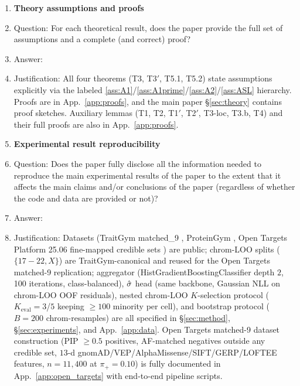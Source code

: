 \begin{enumerate}
\item {\bf Theory assumptions and proofs}
    \item[] Question: For each theoretical result, does the paper provide the full set of assumptions and a complete (and correct) proof?
    \item[] Answer: \answerYes{}
    \item[] Justification: All four theorems (T3, T3$'$, T5.1, T5.2) state assumptions explicitly via the labeled \ref{ass:A1}/\ref{ass:A1prime}/\ref{ass:A2}/\ref{ass:ASL} hierarchy. Proofs are in App.~\ref{app:proofs}, and the main paper §\ref{sec:theory} contains proof sketches. Auxiliary lemmas (T1, T2, T1$'$, T2$'$, T3-loc, T3.b, T4) and their full proofs are also in App.~\ref{app:proofs}.

\item {\bf Experimental result reproducibility}
    \item[] Question: Does the paper fully disclose all the information needed to reproduce the main experimental results of the paper to the extent that it affects the main claims and/or conclusions of the paper (regardless of whether the code and data are provided or not)?
    \item[] Answer: \answerYes{}
    \item[] Justification: Datasets (TraitGym matched\_9 \citep{benegas2025traitgym}, ProteinGym \citep{notin2023proteingym}, Open Targets Platform 25.06 fine-mapped credible sets \citep{ochoa2023opentargets}) are public; chrom-LOO splits ($\{17{-}22, X\}$) are TraitGym-canonical and reused for the Open Targets matched-9 replication; aggregator (HistGradientBoostingClassifier depth $2$, 100 iterations, class-balanced), $\hat{\sigma}$ head (same backbone, Gaussian NLL on chrom-LOO OOF residuals), nested chrom-LOO $K$-selection protocol ($K_{\mathrm{eval}} = 3$/$5$ keeping $\geq 100$ minority per cell), and bootstrap protocol ($B = 200$ chrom-resamples) are all specified in §\ref{sec:method}, §\ref{sec:experiments}, and App.~\ref{app:data}. Open Targets matched-9 dataset construction (PIP $\geq 0.5$ positives, AF-matched negatives outside any credible set, $13$-d gnomAD/VEP/AlphaMissense/SIFT/GERP/LOFTEE features, $n = 11{,}400$ at $\pi_{+} = 0.10$) is fully documented in App.~\ref{app:open_targets} with end-to-end pipeline scripts.


\end{enumerate}
